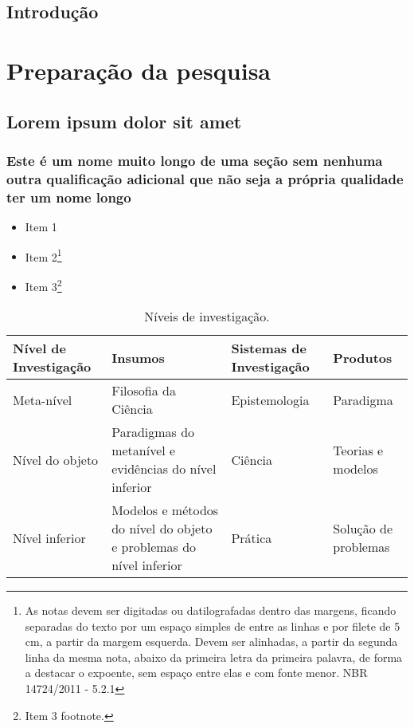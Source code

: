 \documentclass[12pt,oneside,a4paper]{abntex2}
\begin{document}
\chapter*{Introdução}


\lipsum[1-2]

\part{Preparação da pesquisa}

\chapter{Lorem ipsum dolor sit amet}

\section{Este é um nome muito longo de uma seção sem nenhuma outra qualificação
adicional que não seja a própria qualidade ter um nome longo}

\lipsum[3]

\begin{itemize}
  \item Item 1
  \item Item 2\footnote{As notas devem ser digitadas ou datilografadas dentro
  das margens, ficando separadas do texto por um espaço simples de entre as
  linhas e por filete de 5 cm, a partir da margem esquerda. Devem ser
  alinhadas, a partir da segunda linha da mesma nota, abaixo da primeira letra
  da primeira palavra, de forma a destacar o expoente, sem espaço entre elas e
  com fonte menor. NBR 14724/2011 - 5.2.1}
  \item Item 3\footnote{Item 3 footnote.}
\end{itemize}

\lipsum[4]

\begin{table}[htb]
\footnotesize
\caption[Níveis de investigação]{\footnotesize{Níveis de investigação.
\cite{van86}}}
\label{tab-nivinv}
\begin{tabular}{p{2.6cm}|p{6.0cm}|p{2.25cm}|p{3.40cm}}
   \textbf{Nível de Investigação} & \textbf{Insumos}  & \textbf{Sistemas de Investigação}  & \textbf{Produtos}  \\
    \hline
    Meta-nível & Filosofia\index{Filosofia} da Ciência  & Epistemologia &
    Paradigma  \\
    \hline
    Nível do objeto & Paradigmas do metanível e evidências do nível inferior &
    Ciência  & Teorias e modelos \\
    \hline
    Nível inferior & Modelos e métodos do nível do objeto e problemas do nível inferior & Prática & Solução de problemas  \\
\end{tabular}
\end{table}
\end{document}
